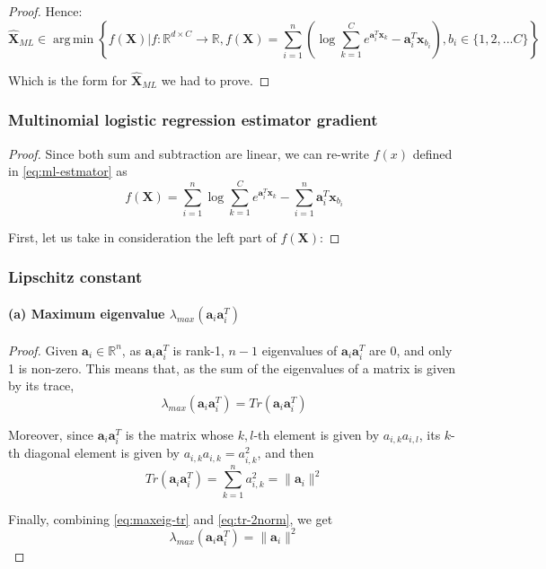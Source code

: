 \documentclass[12pt]{article}
\DeclareMathOperator*{\argmin}{arg\,min}
\newcommand{\expaxsum}{\sum_{k=1}^{C} e^{\mathbf{a}_{i}^T\mathbf{x}_k}}
\newcommand{\boldX}{\mathbf{X}}
\newcommand{\aat}{\mathbf{a}_{i} \mathbf{a}_{i}^{T}}
\begin{document}
\begin{proof}
Hence:
\begin{equation} \label{eq:ml-estmator}
    \hat{\boldX}_{ML} \in \argmin \left \{ f(\boldX) | f: \mathbb{R}^{d \times C} \rightarrow \mathbb{R}, f(\boldX) = \sum_{i=1}^n \left (\log \expaxsum - \mathbf{a}_{i}^T\mathbf{x}_{b_{i}} \right ), b_{i} \in \{1, 2, ... C\} \right \}
\end{equation}

Which is the form for $\hat{\boldX}_{ML}$ we had to prove.
\end{proof}

\subsubsection{Multinomial logistic regression estimator gradient}
\begin{proof}
Since both sum and subtraction are linear, we can re-write $f(x)$ defined in \eqref{eq:ml-estmator} as
\begin{equation}
    f(\boldX) = \sum_{i=1}^n \log \expaxsum - \sum_{i=1}^n \mathbf{a}_{i}^T\mathbf{x}_{b_{i}}
\end{equation}

First, let us take in consideration the left part of $f(\boldX)$: 

\end{proof}


\subsubsection{Lipschitz constant}

\paragraph{(a) Maximum eigenvalue \texorpdfstring{$\lambda_{max}(\aat)$}{Lg}} \label{par:max-eig}
\begin{proof}
Given $\mathbf{a}_i \in \mathbb{R}^{n}$, as $\aat$ is rank-1, $n-1$ eigenvalues of $\aat$ are $0$, and only 1 is non-zero. This means that, as the sum of the eigenvalues of a matrix is given by its trace,
\begin{equation} \label{eq:maxeig-tr}
    \lambda_{max}(\aat) = Tr(\aat)
\end{equation}

Moreover, since $\aat$ is the matrix whose $k,l$-th element is given by $a_{i,k}a_{i,l}$, its $k$-th diagonal element is given by $a_{i,k}a_{i,k} = a_{i,k}^{2}$, and then
\begin{equation} \label{eq:tr-2norm}
    Tr(\aat) = \sum_{k=1}^{n} a_{i,k}^{2} = \lVert \mathbf{a}_{i} \rVert ^{2}
\end{equation}

Finally, combining \eqref{eq:maxeig-tr} and \eqref{eq:tr-2norm}, we get
\begin{equation}
    \lambda_{max}(\aat) = \lVert \mathbf{a}_{i} \rVert ^{2}
\end{equation}

\end{proof}
\end{document}
